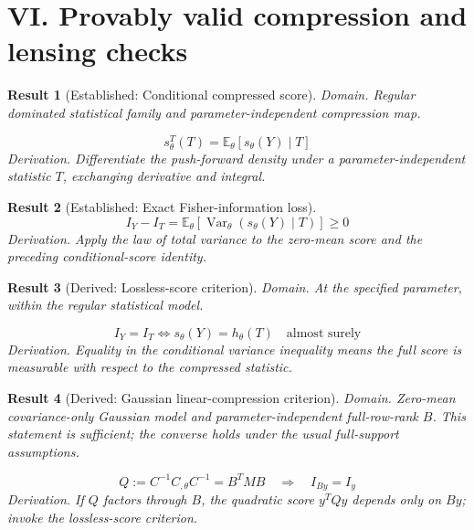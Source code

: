 \documentclass[aps,prd,onecolumn,notitlepage,groupedaddress,11pt]{revtex4-2}
\newtheorem{result}{Result}
\begin{document}
\section{VI. Provably valid compression and lensing checks}

\begin{result}[\textsf{Established}: Conditional compressed score]\label{res:31}
\textit{Domain.} Regular dominated statistical family and parameter-independent compression map.\par
\begin{equation}\label{eq:31}
s_\theta^T(T)=\mathbb E_\theta[s_\theta(Y)\mid T]
\end{equation}
\textit{Derivation.} Differentiate the push-forward density under a parameter-independent statistic $T$, exchanging derivative and integral.
\end{result}

\begin{result}[\textsf{Established}: Exact Fisher-information loss]\label{res:32}
\begin{equation}\label{eq:32}
I_Y-I_T=\mathbb E_\theta[\operatorname{Var}_\theta(s_\theta(Y)\mid T)]\ge0
\end{equation}
\textit{Derivation.} Apply the law of total variance to the zero-mean score and the preceding conditional-score identity.
\end{result}

\begin{result}[\textsf{Derived}: Lossless-score criterion]\label{res:33}
\textit{Domain.} At the specified parameter, within the regular statistical model.\par
\begin{equation}\label{eq:33}
I_Y=I_T\iff s_\theta(Y)=h_\theta(T)\quad\text{almost surely}
\end{equation}
\textit{Derivation.} Equality in the conditional variance inequality means the full score is measurable with respect to the compressed statistic.
\end{result}

\begin{result}[\textsf{Derived}: Gaussian linear-compression criterion]\label{res:34}
\textit{Domain.} Zero-mean covariance-only Gaussian model and parameter-independent full-row-rank $B$. This statement is sufficient; the converse holds under the usual full-support assumptions.\par
\begin{equation}\label{eq:34}
Q:=C^{-1}C_{,\theta}C^{-1}=B^TMB\quad\Longrightarrow\quad I_{By}=I_y
\end{equation}
\textit{Derivation.} If $Q$ factors through $B$, the quadratic score $y^TQy$ depends only on $By$; invoke the lossless-score criterion.
\end{result}
\end{document}
